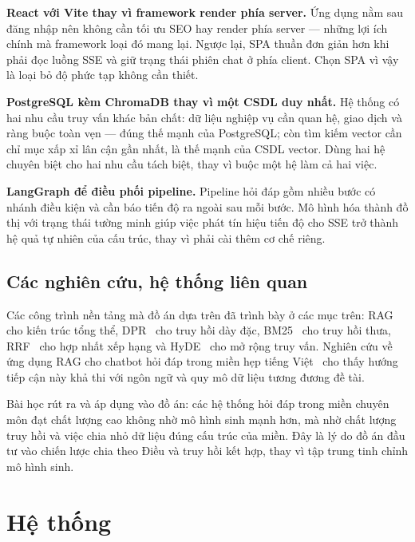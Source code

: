 \documentclass[12pt,a4paper]{report}
\numberwithin{equation}{chapter}
\numberwithin{figure}{chapter}
\numberwithin{table}{chapter}
\begin{document}
\textbf{React với Vite thay vì framework render phía server.} Ứng dụng nằm sau
đăng nhập nên không cần tối ưu SEO hay render phía server --- những lợi ích chính
mà framework loại đó mang lại. Ngược lại, SPA thuần đơn giản hơn khi phải đọc
luồng SSE và giữ trạng thái phiên chat ở phía client. Chọn SPA vì vậy là loại bỏ
độ phức tạp không cần thiết.

\textbf{PostgreSQL kèm ChromaDB thay vì một CSDL duy nhất.} Hệ thống có hai nhu
cầu truy vấn khác bản chất: dữ liệu nghiệp vụ cần quan hệ, giao dịch và ràng buộc
toàn vẹn --- đúng thế mạnh của PostgreSQL; còn tìm kiếm vector cần chỉ mục xấp xỉ
lân cận gần nhất, là thế mạnh của CSDL vector. Dùng hai hệ chuyên biệt cho hai
nhu cầu tách biệt, thay vì buộc một hệ làm cả hai việc.

\textbf{LangGraph để điều phối pipeline.} Pipeline hỏi đáp gồm nhiều bước có
nhánh điều kiện và cần báo tiến độ ra ngoài sau mỗi bước. Mô hình hóa thành đồ thị
với trạng thái tường minh giúp việc phát tín hiệu tiến độ cho SSE trở thành hệ quả
tự nhiên của cấu trúc, thay vì phải cài thêm cơ chế riêng.

\section{Các nghiên cứu, hệ thống liên quan}

Các công trình nền tảng mà đồ án dựa trên đã trình bày ở các mục trên:
RAG~\cite{lewis2020rag} cho kiến trúc tổng thể, DPR~\cite{karpukhin2020dpr} cho
truy hồi dày đặc, BM25~\cite{robertson2009bm25} cho truy hồi thưa,
RRF~\cite{cormack2009rrf} cho hợp nhất xếp hạng và HyDE~\cite{gao2023hyde} cho mở
rộng truy vấn. Nghiên cứu về ứng dụng RAG cho chatbot hỏi đáp trong miền hẹp tiếng
Việt~\cite{duong2026} cho thấy hướng tiếp cận này khả thi với ngôn ngữ và quy mô
dữ liệu tương đương đề tài.

Bài học rút ra và áp dụng vào đồ án: các hệ thống hỏi đáp trong miền chuyên môn
đạt chất lượng cao không nhờ mô hình sinh mạnh hơn, mà nhờ chất lượng truy hồi và
việc chia nhỏ dữ liệu đúng cấu trúc của miền. Đây là lý do đồ án đầu tư vào chiến
lược chia theo Điều và truy hồi kết hợp, thay vì tập trung tinh chỉnh mô hình
sinh.


\chapter{Hệ thống}
\end{document}
